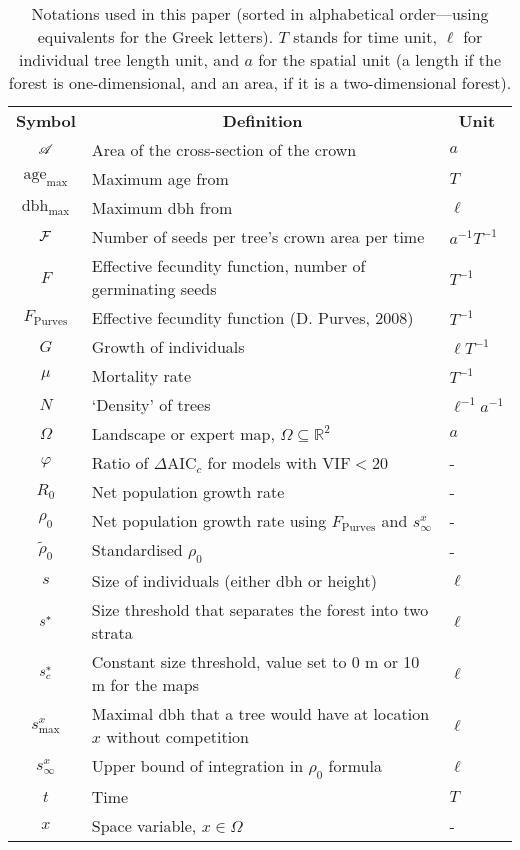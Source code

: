\begin{table}[h]
	\centering
	\caption{Notations used in this paper (sorted in alphabetical order---using equivalents for the Greek letters). $ T $ stands for time unit, $ \ell $ for individual tree length unit, and $ a $ for the spatial unit (a length if the forest is one-dimensional, and an area, if it is a two-dimensional forest).} \label{tab::notations}
	\begin{tabular}{@{}cll@{}}
		\toprule
		\textbf{Symbol} & \multicolumn{1}{c}{\textbf{Definition}} & \multicolumn{1}{c}{\textbf{Unit}} \\
		$ \mathscr{A} $ & Area of the cross-section of the crown &  $ a $ \\
		$ \text{age}_{\max} $ & Maximum age from \citet{Burns1990, Burns1990a} & $ T $ \\
		$ \text{dbh}_{\max} $ & Maximum dbh from \citet{Burns1990, Burns1990a} & $ \ell $ \\
		$ \mathcal{F} $ & Number of seeds per tree's crown area per time & $ a^{-1} T^{-1} $ \\
		$ F $ & Effective fecundity function, \ie number of germinating seeds & $ T^{-1} $ \\
		$ F_{\text{Purves}} $ & Effective fecundity function (D. Purves, 2008) & $ T^{-1} $ \\
		$ G $ & Growth of individuals & $ \ell T^{-1} $ \\
		$ \mu $ & Mortality rate & $ T^{-1} $ \\
		$ N $ & `Density' of trees & $ \ell^{-1} a^{-1} $ \\
		$ \Omega $ & Landscape or expert map, $ \Omega \subseteq \mathds{R}^2 $ & $ a $ \\
		$ \varphi $ & Ratio of $ \Delta \text{AIC}_c $ for models with $ \text{VIF} < 20 $ & - \\
		$ R_0 $ & Net population growth rate & - \\
		$ \rho_0 $ & Net population growth rate using $ F_{\text{Purves}} $ and $ s_{\infty}^{x} $ & - \\
		$ \tilde \rho_0 $ & Standardised $ \rho_0 $ & - \\
		$ s $ & Size of individuals (either dbh or height) & $ \ell $ \\
		$ {s}^{*} $ & Size threshold that separates the forest into two strata & $ \ell $ \\
		$ {s}^{*}_c $ & Constant size threshold, value set to 0 m or 10 m for the maps & $ \ell $ \\
		$ s_{\max}^{x} $ & Maximal dbh that a tree would have at location $ x $ without competition & $ \ell $ \\
		$ s_{\infty}^{x} $ & Upper bound of integration in $ \rho_0 $ formula & $ \ell $ \\
		$ t $ & Time & $ T $ \\
		$ x $ & Space variable, $ x \in \Omega $ & - \\
		\bottomrule
	\end{tabular}
\end{table}

